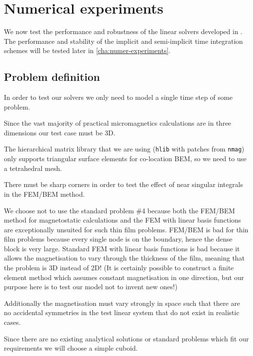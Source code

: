 

\section{Numerical experiments}

We now test the performance and robustness of the linear solvers developed in .
The performance and stability of the implicit and semi-implicit time integration schemes will be tested later in \cref{cha:numer-experiments}.


\subsection{Problem definition}

In order to test our solvers we only need to model a single time step of some problem.

Since the vast majority of practical micromagnetics calculations are in three dimensions our test case must be 3D.

The hierarchical matrix library that we are using (\texttt{hlib} with patches from \texttt{nmag}) only supports triangular surface elements for co-location BEM, so we need to use a tetrahedral mesh.

There must be sharp corners in order to test the effect of near singular integrals in the FEM/BEM method.

We choose not to use the \mumag standard problem \#4 because both the FEM/BEM method for magnetostatic calculations and the FEM with linear basis functions are exceptionally unsuited for such thin film problems.
FEM/BEM is bad for thin film problems because every single node is on the boundary, hence the dense block is very large.
Standard FEM with linear basis functions is bad because it allows the magnetisation to vary through the thickness of the film, meaning that the problem is 3D instead of 2D!
(It is certainly possible to construct a finite element method which assumes constant magnetisation in one direction, but our purpose here is to test our model not to invent new ones!)

Additionally the magnetisation must vary strongly in space such that there are no accidental symmetries in the test linear system that do not exist in realistic cases.  

Since there are no existing analytical solutions or standard problems which fit our requirements we will choose a simple cuboid.

